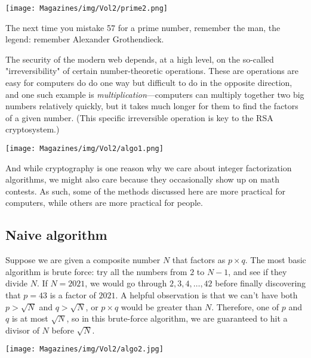 \documentclass{article}
\begin{document}
\begin{multicols}{3}
\begin{center}
    \texttt{[image: Magazines/img/Vol2/prime2.png]}
\end{center}

The next time you mistake 57 for a prime number, remember the man, the legend: remember Alexander Grothendieck.
\closearticle

The security of the modern web depends, at a high level, on the so-called "irreversibility" of certain number-theoretic operations. These are operations are easy for computers do do one way but difficult to do in the opposite direction, and one such example is \textit{multiplication}---computers can multiply together two big numbers relatively quickly, but it takes much longer for them to find the factors of a given number. (This specific irreversible operation is key to the RSA cryptosystem.)

\begin{center}
    \texttt{[image: Magazines/img/Vol2/algo1.png]}
\end{center}

And while cryptography is one reason why we care about integer factorization algorithms, we might also care because they occasionally show up on math contests. As such, some of the methods discussed here are more practical for computers, while others are more practical for people.

\subsection*{Naive algorithm}

Suppose we are given a composite number $N$ that factors as $p \times q$. The most basic algorithm is brute force: try all the numbers from $2$ to $N - 1$, and see if they divide $N$. If $N = 2021$, we would go through $2, 3, 4, \dots, 42$ before finally discovering that $p = 43$ is a factor of $2021$. A helpful observation is that we can't have both $p > \sqrt{N}$ and $q > \sqrt{N}$, or $p \times q$ would be greater than $N$. Therefore, one of $p$ and $q$ is at most $\sqrt{N}$, so in this brute-force algorithm, we are guaranteed to hit a divisor of $N$ before $\sqrt{N}$.

\begin{center}
    \texttt{[image: Magazines/img/Vol2/algo2.jpg]}
\end{center}


\end{multicols}
\end{document}
